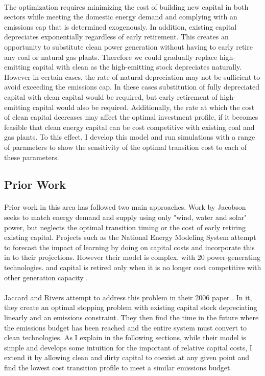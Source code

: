 \documentclass{article}
\begin{document}
\paragraph{} The optimization requires minimizing the cost of building new capital in both sectors while meeting the domestic energy demand and complying with an emissions cap that is determined exogenously. In addition, existing capital depreciates exponentially regardless of early retirement. This creates an opportunity to substitute clean power generation without having to early retire any coal or natural gas plants. Therefore we could gradually replace high-emitting capital with clean as the high-emitting stock depreciates naturally. However in certain cases, the rate of natural depreciation may not be sufficient to avoid exceeding the emissions cap. In these cases substitution of fully depreciated capital with clean capital would be required, but early retirement of high-emitting capital would also be required. Additionally, the rate at which the cost of clean capital decreases may affect the optimal investment profile, if it becomes feasible that clean energy capital can be cost competitive with existing coal and gas plants. To this effect, I develop this model and run simulations with a range of parameters to show the sensitivity of the optimal transition cost to each of these parameters. 


\subsection{Prior Work}

\paragraph{} Prior work in this area has followed two main approaches. Work by Jacobson \cite{Jacobson} seeks to match energy demand and supply using only "wind, water and solar" power, but neglects the optimal transition timing or the cost of early retiring existing capital. Projects such as the National Energy Modeling System attempt to forecast the impact of learning by doing on capital costs and incorporate this in to their projections. However their model is complex, with 20 power-generating technologies. and capital is retired only when it is no longer cost competitive with other generation capacity \cite{NEMS}. 

\paragraph{} Jaccard and Rivers attempt to address this problem in their 2006 paper \cite{JR2006}. In it, they create an optimal stopping problem with existing capital stock depreciating linearly and an emissions constraint. They then find the time in the future where the emissions budget has been reached and the entire system must convert to clean technologies. As I explain in the following sections, while their model is simple and develops some intuition for the important of relative capital costs, I extend it by allowing clean and dirty capital to coexist at any given point and find the lowest cost transition profile to meet a similar emissions budget. 
\end{document}
